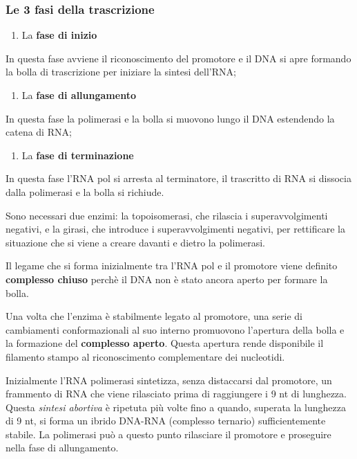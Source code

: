 \documentclass[]{article}
\begin{document}
\subsubsection{Le 3 fasi della
trascrizione}\label{le-3-fasi-della-trascrizione}

\begin{enumerate}
\def\labelenumi{\arabic{enumi}.}
\itemsep1pt\parskip0pt
\item
  La \textbf{fase di inizio}
\end{enumerate}

In questa fase avviene il riconoscimento del promotore e il DNA si apre
formando la bolla di trascrizione per iniziare la sintesi dell'RNA;

\begin{enumerate}
\def\labelenumi{\arabic{enumi}.}
\setcounter{enumi}{1}
\itemsep1pt\parskip0pt
\item
  La \textbf{fase di allungamento}
\end{enumerate}

In questa fase la polimerasi e la bolla si muovono lungo il DNA
estendendo la catena di RNA;

\begin{enumerate}
\def\labelenumi{\arabic{enumi}.}
\setcounter{enumi}{2}
\itemsep1pt\parskip0pt
\item
  La \textbf{fase di terminazione}
\end{enumerate}

In questa fase l'RNA pol si arresta al terminatore, il trascritto di RNA
si dissocia dalla polimerasi e la bolla si richiude.

Sono necessari due enzimi: la topoisomerasi, che rilascia i
superavvolgimenti negativi, e la girasi, che introduce i
superavvolgimenti negativi, per rettificare la situazione che si viene a
creare davanti e dietro la polimerasi.

Il legame che si forma inizialmente tra l'RNA pol e il promotore viene
definito \textbf{complesso chiuso} perchè il DNA non è stato ancora
aperto per formare la bolla.

Una volta che l'enzima è stabilmente legato al promotore, una serie di
cambiamenti conformazionali al suo interno promuovono l'apertura della
bolla e la formazione del \textbf{complesso aperto}. Questa apertura
rende disponibile il filamento stampo al riconoscimento complementare
dei nucleotidi.

Inizialmente l'RNA polimerasi sintetizza, senza distaccarsi dal
promotore, un frammento di RNA che viene rilasciato prima di raggiungere
i 9 nt di lunghezza. Questa \emph{sintesi abortiva} è ripetuta più volte
fino a quando, superata la lunghezza di 9 nt, si forma un ibrido DNA-RNA
(complesso ternario) sufficientemente stabile. La polimerasi può a
questo punto rilasciare il promotore e proseguire nella fase di
allungamento.
\end{document}

